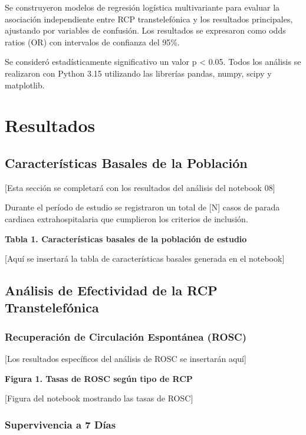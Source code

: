 \documentclass[10pt,a4paper]{article}
\begin{document}
\begin{multicols}{2}
Se construyeron modelos de regresión logística multivariante para evaluar la asociación independiente entre RCP transtelefónica y los resultados principales, ajustando por variables de confusión. Los resultados se expresaron como odds ratios (OR) con intervalos de confianza del 95\%.

Se consideró estadísticamente significativo un valor p < 0.05. Todos los análisis se realizaron con Python 3.15 utilizando las librerías pandas, numpy, scipy y matplotlib.

\section{Resultados}

\subsection{Características Basales de la Población}

[Esta sección se completará con los resultados del análisis del notebook 08]

Durante el período de estudio se registraron un total de [N] casos de parada cardiaca extrahospitalaria que cumplieron los criterios de inclusión.

\textbf{Tabla 1. Características basales de la población de estudio}

[Aquí se insertará la tabla de características basales generada en el notebook]

\subsection{Análisis de Efectividad de la RCP Transtelefónica}

\subsubsection{Recuperación de Circulación Espontánea (ROSC)}

[Los resultados específicos del análisis de ROSC se insertarán aquí]

\textbf{Figura 1. Tasas de ROSC según tipo de RCP}

[Figura del notebook mostrando las tasas de ROSC]

\subsubsection{Supervivencia a 7 Días}


\end{multicols}
\end{document}
